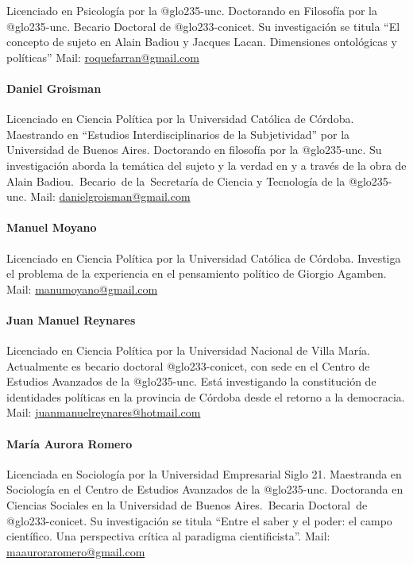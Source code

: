 Licenciado en Psicología por la \gls{@glo235-unc}. Doctorando en Filosofía por la \gls{@glo235-unc}. Becario Doctoral de \gls{@glo233-conicet}. Su investigación se titula \enquote{El concepto de sujeto en Alain Badiou y Jacques Lacan. Dimensiones ontológicas y políticas} Mail: \url{roquefarran@gmail.com}

\paragraph{Daniel Groisman}

Licenciado en Ciencia Política por la Universidad Católica de Córdoba. Maestrando en \enquote{Estudios Interdisciplinarios de la Subjetividad} por la Universidad de Buenos Aires. Doctorando en filosofía por la \gls{@glo235-unc}. Su investigación aborda la temática del sujeto y la verdad en y a través de la obra de Alain Badiou.~Becario~de la~Secretaría de Ciencia y Tecnología de la \gls{@glo235-unc}. Mail: \url{danielgroisman@gmail.com}

\paragraph{Manuel Moyano}

Licenciado en Ciencia Política por la Universidad Católica de Córdoba. Investiga el problema de la experiencia en el pensamiento político de Giorgio Agamben. Mail: \url{manumoyano@gmail.com}

\paragraph{Juan Manuel Reynares}

Licenciado en Ciencia Política por la Universidad Nacional de Villa María. Actualmente es becario doctoral \gls{@glo233-conicet}, con sede en el Centro de Estudios Avanzados de la \gls{@glo235-unc}. Está investigando la constitución de identidades políticas en la provincia de Córdoba desde el retorno a la democracia. Mail: \url{juanmanuelreynares@hotmail.com}

\paragraph{María Aurora Romero}

Licenciada en Sociología por la Universidad Empresarial Siglo 21. Maestranda en Sociología en el Centro de Estudios Avanzados de la \gls{@glo235-unc}. Doctoranda en Ciencias Sociales en la Universidad de Buenos Aires.~Becaria Doctoral~de \gls{@glo233-conicet}. Su investigación se titula \enquote{Entre el saber y el poder: el campo científico. Una perspectiva crítica al paradigma cientificista}. Mail: \url{maauroraromero@gmail.com}

